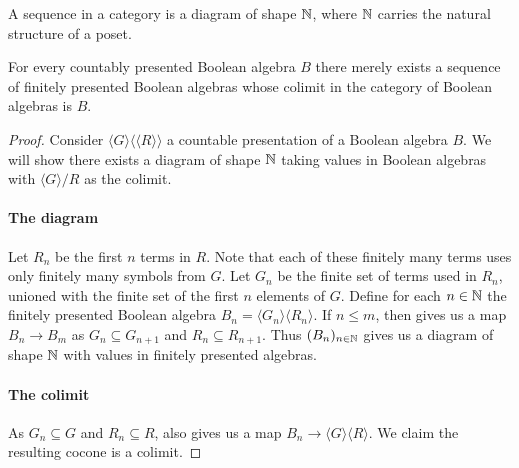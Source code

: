 \begin{definition}
  A sequence in a category is a diagram of shape $\mathbb{N}$, 
  where $\mathbb{N}$ carries the natural structure of a poset. 
\end{definition}
\begin{lemma}\label{lemProFinitePresentation}
  For every countably presented Boolean algebra $B$
  there merely exists a sequence of finitely presented Boolean algebras 
  whose colimit in the category of Boolean algebras is $B$. 
\end{lemma}
\begin{proof}
  Consider $\langle G \rangle \langle\langle R \rangle\rangle$ a countable presentation of a Boolean algebra $B$. 
  We will show there exists a diagram of shape $\mathbb{N}$ taking values in Boolean algebras 
  with $\langle G\rangle / R$ as the colimit.
  \paragraph{The diagram}
  Let $R_n$ be the first $n$ terms in $R$. 
  Note that each of these finitely many terms uses only finitely many symbols from $G$.
  Let $G_n$ be the finite set of terms used in $R_n$, unioned with the finite set of the first $n$ elements of $G$. 
  Define for each $n\in\mathbb{N}$ the finitely presented Boolean algebra $B_n = \langle G_n \rangle  \langle R_n \rangle$. 
  If $n\leq m$, then  gives us a map $B_n \to B_m$ 
  as $G_n \subseteq G_{n+1}$ and $R_n \subseteq R_{n+1}$. 
  Thus $(B_n)_{n\in \mathbb{N}}$ gives us a diagram of shape $\mathbb{N}$
  with values in finitely presented algebras. 

  \paragraph{The colimit}
  As $G_n\subseteq G$ and $R_n \subseteq R$, 
   also gives us a map $B_n\to \langle G \rangle \langle R \rangle$. 
  We claim the resulting cocone is a colimit. 


\end{proof}
